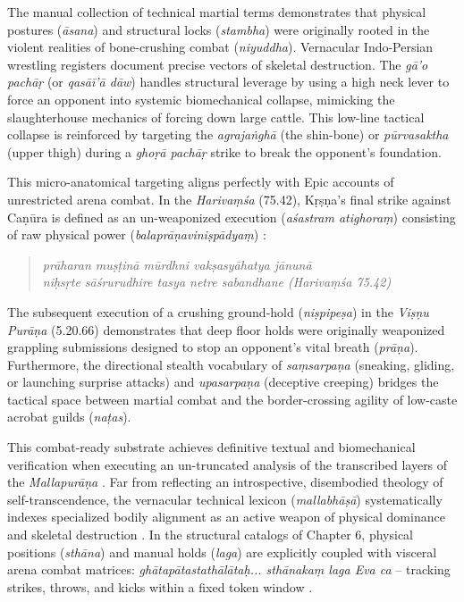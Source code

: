 \documentclass[11pt,twoside,letterpaper]{article}
\begin{document}
The manual collection of technical martial terms demonstrates that physical postures (\textit{āsana}) and structural locks (\textit{stambha}) were originally rooted in the violent realities of bone-crushing combat (\textit{niyuddha}). Vernacular Indo-Persian wrestling registers document precise vectors of skeletal destruction. The \textit{gā’o pachāṛ} (or \textit{qasāī’ā dāw}) handles structural leverage by using a high neck lever to force an opponent into systemic biomechanical collapse, mimicking the slaughterhouse mechanics of forcing down large cattle. This low-line tactical collapse is reinforced by targeting the \textit{agrajaṅghā} (the shin-bone) or \textit{pūrvasaktha} (upper thigh) during a \textit{ghoṛā pachāṛ} strike to break the opponent’s foundation.

This micro-anatomical targeting aligns perfectly with Epic accounts of unrestricted arena combat. In the \textit{Harivaṃśa} (75.42), Kṛṣṇa’s final strike against Caṇūra is defined as an un-weaponized execution (\textit{aśastram atighoraṃ}) consisting of raw physical power (\textit{balaprāṇaviniṣpādyaṃ}) \cite{HV_App}:
\begin{quote}
    \textit{prāharan muṣṭinā mūrdhni vakṣasyāhatya jānunā} \\
    \textit{niḥsṛte sāśrurudhire tasya netre sabandhane (Harivaṃśa 75.42)}
\end{quote}

The subsequent execution of a crushing ground-hold (\textit{niṣpipeṣa}) in the \textit{Viṣṇu Purāṇa} (5.20.66) demonstrates that deep floor holds were originally weaponized grappling submissions designed to stop an opponent’s vital breath (\textit{prāṇa}). Furthermore, the directional stealth vocabulary of \textit{saṃsarpaṇa} (sneaking, gliding, or launching surprise attacks) and \textit{upasarpaṇa} (deceptive creeping) bridges the tactical space between martial combat and the border-crossing agility of low-caste acrobat guilds (\textit{naṭas}).

This combat-ready substrate achieves definitive textual and biomechanical verification when executing an un-truncated analysis of the transcribed layers of the \textit{Mallapurāṇa} \cite{MP_7}. Far from reflecting an introspective, disembodied theology of self-transcendence, the vernacular technical lexicon (\textit{mallabhāṣā}) systematically indexes specialized bodily alignment as an active weapon of physical dominance and skeletal destruction \cite{MP_7}. In the structural catalogs of Chapter 6, physical positions (\textit{sthāna}) and manual holds (\textit{laga}) are explicitly coupled with visceral arena combat matrices: \textit{ghātapātastathālātaḥ... sthānakaṃ laga Eva ca} -- tracking strikes, throws, and kicks within a fixed token window \cite{MP_7}. 
\end{document}
